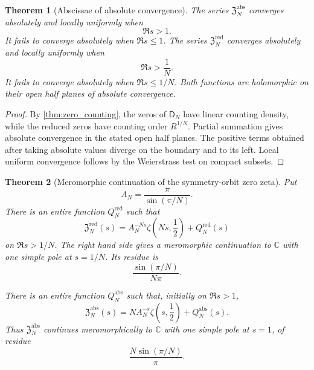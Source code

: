 \documentclass[11pt,letterpaper]{article}
\newtheorem{theorem}{Theorem}[section]
\theoremstyle{definition}
\theoremstyle{remark}
\newcommand{\CC}{\mathbb C}
\newcommand{\Dfun}{\mathsf D}
\begin{document}
\begin{theorem}[Abscissae of absolute convergence]\label{thm:zeta_convergence}
The series $\mathfrak Z_N^{\mathrm{abs}}$ converges absolutely and locally uniformly when
\[
\Re s>1.
\]
It fails to converge absolutely when $\Re s\leq1$.  The series $\mathfrak Z_N^{\mathrm{red}}$ converges absolutely and locally uniformly when
\[
\Re s>\frac1N.
\]
It fails to converge absolutely when $\Re s\leq1/N$.  Both functions are holomorphic on their open half planes of absolute convergence.
\end{theorem}

\begin{proof}
By \cref{thm:zero_counting}, the zeros of $\Dfun_N$ have linear counting density, while the reduced zeros have counting order $R^{1/N}$.  Partial summation gives absolute convergence in the stated open half planes.  The positive terms obtained after taking absolute values diverge on the boundary and to its left.  Local uniform convergence follows by the Weierstrass test on compact subsets.
\end{proof}

\begin{theorem}[Meromorphic continuation of the symmetry-orbit zero zeta]\label{thm:zeta_continuation}
Put
\[
A_N=\frac\pi{\sin(\pi/N)}.
\]
There is an entire function $Q_N^{\mathrm{red}}$ such that
\[
\mathfrak Z_N^{\mathrm{red}}(s)
=
A_N^{-Ns}\zeta\left(Ns,\frac12\right)+Q_N^{\mathrm{red}}(s)
\]
on $\Re s>1/N$.  The right hand side gives a meromorphic continuation to $\CC$ with one simple pole at $s=1/N$.  Its residue is
\[
\frac{\sin(\pi/N)}{N\pi}.
\]

There is an entire function $Q_N^{\mathrm{abs}}$ such that, initially on
$\Re s>1$,
\[
\mathfrak Z_N^{\mathrm{abs}}(s)
=
N A_N^{-s}\zeta\left(s,\frac12\right)+Q_N^{\mathrm{abs}}(s).
\]
Thus $\mathfrak Z_N^{\mathrm{abs}}$ continues meromorphically to $\CC$ with one simple pole at $s=1$, of residue
\[
\frac{N\sin(\pi/N)}\pi.
\]
\end{theorem}
\end{document}
